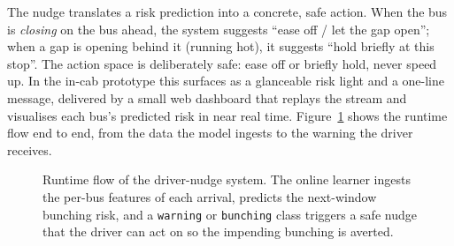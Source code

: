 \documentclass[final,5p,times,twocolumn,authoryear]{elsarticle}
\begin{document}
The nudge translates a risk prediction into a concrete, safe action. When the bus is \emph{closing}
on the bus ahead, the system suggests ``ease off / let the gap open''; when a gap is opening behind
it (running hot), it suggests ``hold briefly at this stop''. The action space is deliberately safe:
ease off or briefly hold, never speed up. In the in-cab prototype this surfaces as a glanceable
risk light and a one-line message, delivered by a small web dashboard that replays the stream and
visualises each bus's predicted risk in near real time. Figure~\ref{fig:system} shows the runtime
flow end to end, from the data the model ingests to the warning the driver receives.

\begin{figure}[t]
\centering
{}
\caption{Runtime flow of the driver-nudge system. The online learner ingests the per-bus features
of each arrival, predicts the next-window bunching risk, and a \texttt{warning} or
\texttt{bunching} class triggers a safe nudge that the driver can act on so the impending bunching
is averted.}
\label{fig:system}
\end{figure}
\end{document}
